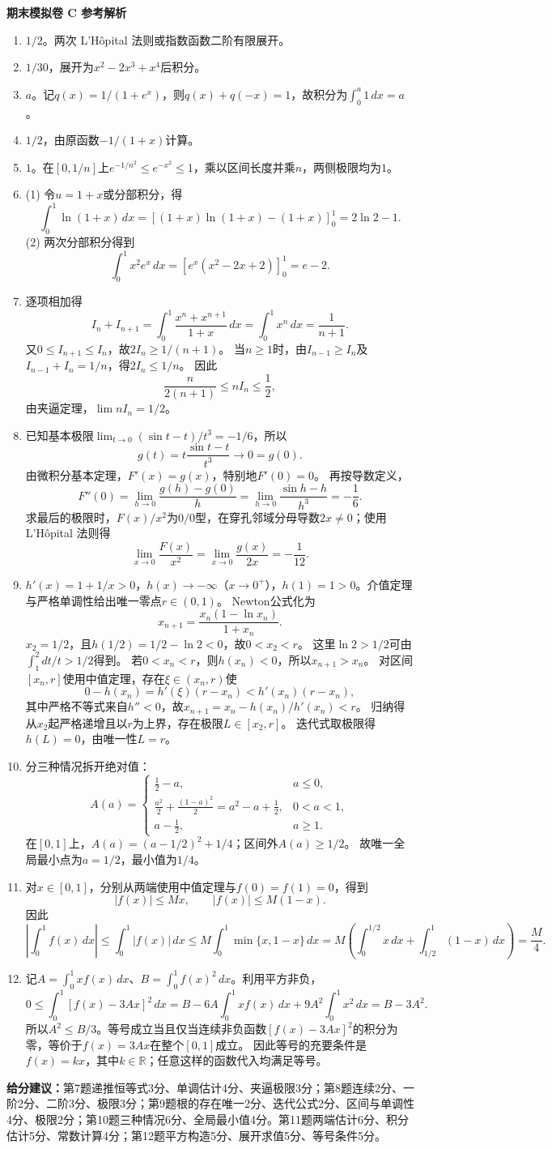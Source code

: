 \documentclass[11pt,a4paper,fontset=fandol]{ctexart}
\newcommand{\answerpaper}[1]{\clearpage\begin{center}{\LARGE\bfseries #1}\end{center}}
\begin{document}
\answerpaper{期末模拟卷 C 参考解析}
\begin{enumerate}
\item $1/2$。两次 L'Hôpital 法则或指数函数二阶有限展开。
\item $1/30$，展开为$x^2-2x^3+x^4$后积分。
\item $a$。记$q(x)=1/(1+e^x)$，则$q(x)+q(-x)=1$，故积分为$\int_0^a1\,dx=a$。
\item $1/2$，由原函数$-1/(1+x)$计算。
\item $1$。在$[0,1/n]$上$e^{-1/n^2}\le e^{-x^2}\le1$，乘以区间长度并乘$n$，两侧极限均为$1$。
\item (1) 令$u=1+x$或分部积分，得
\[\int_0^1\ln(1+x)\,dx=[(1+x)\ln(1+x)-(1+x)]_0^1=2\ln2-1.\]
(2) 两次分部积分得到
\[\int_0^1x^2e^x\,dx=[e^x(x^2-2x+2)]_0^1=e-2.\]
\item 逐项相加得
\[I_n+I_{n+1}=\int_0^1\frac{x^n+x^{n+1}}{1+x}\,dx
=\int_0^1x^n\,dx=\frac1{n+1}.\]
又$0\le I_{n+1}\le I_n$，故$2I_n\ge1/(n+1)$。
当$n\ge1$时，由$I_{n-1}\ge I_n$及$I_{n-1}+I_n=1/n$，得$2I_n\le1/n$。
因此
\[\frac{n}{2(n+1)}\le nI_n\le\frac12,\]
由夹逼定理，$\lim nI_n=1/2$。
\item 已知基本极限$\lim_{t\to0}(\sin t-t)/t^3=-1/6$，所以
\[g(t)=t\frac{\sin t-t}{t^3}\to0=g(0).\]
由微积分基本定理，$F'(x)=g(x)$，特别地$F'(0)=0$。
再按导数定义，
\[F''(0)=\lim_{h\to0}\frac{g(h)-g(0)}h
=\lim_{h\to0}\frac{\sin h-h}{h^3}=-\frac16.\]
求最后的极限时，$F(x)/x^2$为$0/0$型，在穿孔邻域分母导数$2x\ne0$；使用 L'Hôpital 法则得
\[\lim_{x\to0}\frac{F(x)}{x^2}=\lim_{x\to0}\frac{g(x)}{2x}=-\frac1{12}.\]
\item $h'(x)=1+1/x>0$，$h(x)\to-\infty$（$x\to0^+$），$h(1)=1>0$。介值定理与严格单调性给出唯一零点$r\in(0,1)$。
Newton公式化为
\[x_{n+1}=\frac{x_n(1-\ln x_n)}{1+x_n}.\]
$x_2=1/2$，且$h(1/2)=1/2-\ln2<0$，故$0<x_2<r$。
这里$\ln2>1/2$可由$\int_1^2dt/t>1/2$得到。
若$0<x_n<r$，则$h(x_n)<0$，所以$x_{n+1}>x_n$。
对区间$[x_n,r]$使用中值定理，存在$\xi\in(x_n,r)$使
\[0-h(x_n)=h'(\xi)(r-x_n)<h'(x_n)(r-x_n),\]
其中严格不等式来自$h''<0$，故$x_{n+1}=x_n-h(x_n)/h'(x_n)<r$。
归纳得从$x_2$起严格递增且以$r$为上界，存在极限$L\in[x_2,r]$。
迭代式取极限得$h(L)=0$，由唯一性$L=r$。
\item 分三种情况拆开绝对值：
\[A(a)=\begin{cases}
\frac12-a,&a\le0,\\
\frac{a^2}2+\frac{(1-a)^2}2=a^2-a+\frac12,&0<a<1,\\
a-\frac12,&a\ge1.
\end{cases}\]
在$[0,1]$上，$A(a)=(a-1/2)^2+1/4$；区间外$A(a)\ge1/2$。
故唯一全局最小点为$a=1/2$，最小值为$1/4$。
\item 对$x\in[0,1]$，分别从两端使用中值定理与$f(0)=f(1)=0$，得到
\[|f(x)|\le Mx,\qquad |f(x)|\le M(1-x).\]
因此
\[\left|\int_0^1f(x)\,dx\right|
\le\int_0^1|f(x)|\,dx
\le M\int_0^1\min\{x,1-x\}\,dx
=M\left(\int_0^{1/2}x\,dx+\int_{1/2}^1(1-x)\,dx\right)=\frac M4.\]
\item 记$A=\int_0^1x f(x)\,dx$、$B=\int_0^1f(x)^2\,dx$。利用平方非负，
\[0\le\int_0^1[f(x)-3Ax]^2\,dx
=B-6A\int_0^1xf(x)\,dx+9A^2\int_0^1x^2\,dx
=B-3A^2.\]
所以$A^2\le B/3$。等号成立当且仅当连续非负函数$[f(x)-3Ax]^2$的积分为零，等价于$f(x)=3Ax$在整个$[0,1]$成立。
因此等号的充要条件是$f(x)=kx$，其中$k\in\mathbb R$；任意这样的函数代入均满足等号。
\end{enumerate}
\textbf{给分建议：}第7题递推恒等式3分、单调估计4分、夹逼极限3分；第8题连续2分、一阶2分、二阶3分、极限3分；第9题根的存在唯一2分、迭代公式2分、区间与单调性4分、极限2分；第10题三种情况6分、全局最小值4分。第11题两端估计6分、积分估计5分、常数计算4分；第12题平方构造5分、展开求值5分、等号条件5分。
\end{document}
